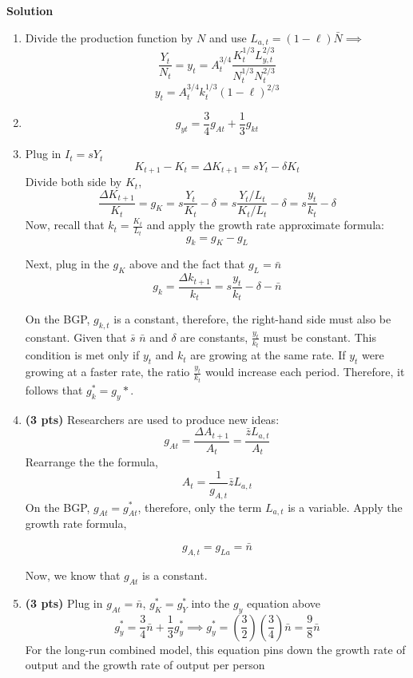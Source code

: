 \documentclass[14pt, oneside]{memoir}
\begin{document}
\begin{enumerate}[label=\textbf{\arabic*.}, itemsep=15pt]
\begin{enumerate}[label=(\alph*)]
\end{enumerate}

\clearpage
\textbf{Solution}
\begin{enumerate}[label=(\alph*)]
	\item  
	Divide the production function by $N$ and use $L_{a,t} = (1-\ell) \bar{N} \implies $
	 \[\frac{Y_t}{N_t} = y_t= A_t^{3/4} \frac{K_t^{1/3} L_{y,t}^{2/3}}{N_t^{1/3} N_{t}^{2/3}}  \]
	 \[y_t= A_t^{3/4} k_t^{1/3} (1-\ell)^{2/3}\]

	\item 
		\[
		g_{yt} = \frac{3}{4} g_{At} + \frac{1}{3} g_{kt} 
		\]
		
	\item 
	
	Plug in $I_t = s Y_t$
	\[K_{t+1}- K_t = \Delta K_{t+1}=  sY_t -\delta K_t\]
	Divide both side by $K_t$,
	\[\frac{\Delta K_{t+1}}{K_t} = g_K  = s\frac{Y_t }{K_t}-\delta = s\frac{Y_t/L_t }{K_t/L_t}-\delta = s\frac{y_t }{k_t}-\delta\]
	Now, recall that $k_t = \frac{K_t}{L_t}$ and apply the growth rate approximate formula:
	\[g_k = g_K - g_L\]
	
	Next, plug in the $g_K$ above and the fact that $g_L = \bar{n}$
	\[g_k= \frac{\Delta k_{t+1}}{k_t} = s\frac{y_t }{k_t}-\delta - \bar{n}\]

	
	On the BGP, \(g_{k,t}\) is a constant, therefore, the right-hand side must also be constant. Given that \(\bar{s}\) $\bar{n}$ and \(\delta\) are constants, \(\frac{y_t}{k_t}\) must be constant. This condition is met only if \(y_t\) and \(k_t\) are growing at the same rate. If \(y_t\) were growing at a faster rate, the ratio \(\frac{y_t}{k_t}\) would increase each period. Therefore, it follows that \(g_k^* = g_y*\).
	
	\vspace{1cm}
		
		
	\newpage
	\item \textbf{(3 pts)} 	
	Researchers are used to produce new ideas:
	\[g_{At} = \frac{\Delta A_{t+1}}{A_t} =\frac{\bar{z}L_{a,t}}{A_t} \]
	Rearrange the the formula,
	\[A_t = \frac{1}{g_{A,t}} \bar{z} L_{a,t}\]
	On  the BGP, $g_{At} = g^*_{At}$, therefore, only the term $L_{a,t}$ is a variable. Apply the growth rate formula,
	
	\[g_{A,t} = g_{La} = \bar{n}\]
	
	Now, we know that $g_{At}$ is a constant.
	
	
	\item \textbf{(3 pts)}	
	Plug in $g_{At}=\bar{n}$, $g_K^* = g_Y^*$ into the $g_y$ equation above
	\[g_{y}^* = \frac{3}{4}\bar{n} + \frac{1}{3} g_{y}^* \implies g_{y}^* = \left(\frac{3}{2}\right) \left(\frac{3}{4}\right)\bar{n} = \frac{9}{8} \bar{n}\]
	For the long-run combined model, this equation pins down	the growth rate of output and 	the growth rate of output per person
	

\end{enumerate}
\end{enumerate}
\end{document}
